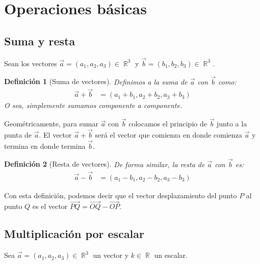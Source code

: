 \documentclass[12pt, fleqn]{report}                             %
\newtheorem{Definition}{Definición}[section]                    %
\DeclareMathOperator \Reals        {\mathbb{R}}                 %
\newcommand{\lVec}[1]{\overrightarrow{#1}}                      %
\begin{document}
        \section{Operaciones básicas}
        
            \subsection{Suma y resta}
            
            Sean los vectores $\vec{a}=(a_1, a_2, a_3) \in \Reals^3$ y $\vec{b}=(b_1, b_2, b_3) \in \Reals^3$.
            
            \begin{Definition}[Suma de vectores]
                Definimos a la suma de $\vec{a}$ con $\vec{b}$ como:
                \begin{align}
                    \vec{a}+\vec{b} &= (a_1 + b_1, a_2 + b_2, a_3 + b_3) \label{defSuma}
                \end{align}
                O sea, simplemente sumamos componente a componente.
            \end{Definition}
        
            Geométricamente, para sumar $\vec{a}$ con $\vec{b}$ colocamos el principio de $\vec{b}$ junto a la punta de $\vec{a}$. El vector $\vec{a}+\vec{b}$ será el vector que comienza en donde comienza $\vec{a}$ y termina en donde termina $\vec{b}$.
        
            \begin{Definition}[Resta de vectores]
                De forma similar, la resta de $\vec{a}$ con $\vec{b}$ es:
                \begin{align}
                    \vec{a}-\vec{b} &= (a_1 - b_1, a_2 - b_2, a_3 - b_3) \label{defResta}
                \end{align}
            \end{Definition}
        
            Con esta definición, podemos decir que el vector desplazamiento del punto $P$ al punto $Q$ es el vector $\lVec{PQ} = \lVec{OQ} - \lVec{OP}$.
            
            
            \subsection{Multiplicación por escalar}
            
            Sea $\vec{a}=(a_1, a_2, a_3) \in \Reals^3$ un vector y $k \in \Reals$ un escalar.
            
\end{document}
